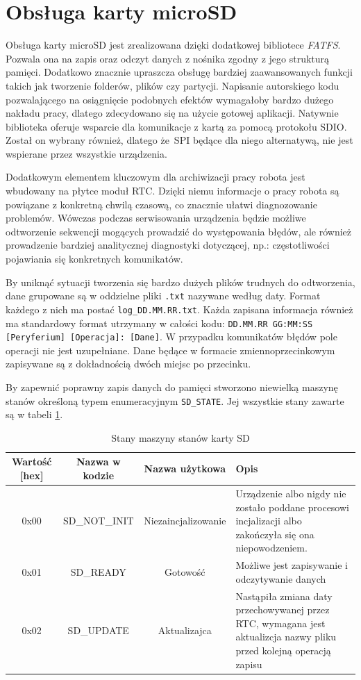 \section{Obsługa karty microSD}
Obsługa karty microSD jest zrealizowana dzięki dodatkowej bibliotece \textit{FATFS}. Pozwala ona na zapis oraz odczyt danych z nośnika zgodny z jego strukturą pamięci. Dodatkowo znacznie upraszcza obsługę bardziej zaawansowanych funkcji takich jak tworzenie folderów, plików czy partycji. Napisanie autorskiego kodu pozwalającego na osiągnięcie podobnych efektów wymagałoby bardzo dużego nakładu pracy, dlatego zdecydowano się na użycie gotowej aplikacji. Natywnie biblioteka oferuje wsparcie dla komunikacje z kartą za pomocą protokołu SDIO. Został on wybrany również, dlatego że~SPI będące dla niego alternatywą, nie jest wspierane przez wszystkie urządzenia. 

Dodatkowym elementem kluczowym dla archiwizacji pracy robota jest wbudowany na płytce moduł RTC. Dzięki niemu informacje o pracy robota są powiązane z konkretną chwilą czasową, co znacznie ułatwi diagnozowanie problemów. Wówczas podczas serwisowania urządzenia będzie możliwe odtworzenie sekwencji mogących prowadzić do występowania błędów, ale również prowadzenie bardziej analitycznej diagnostyki dotyczącej, np.: częstotliwości pojawiania się konkretnych komunikatów. 

By uniknąć sytuacji tworzenia się bardzo dużych plików trudnych do odtworzenia, dane grupowane są w oddzielne pliki \texttt{.txt} nazywane według daty. Format każdego z nich ma postać \texttt{log\_DD.MM.RR.txt}. Każda zapisana informacja również ma standardowy format utrzymany w całości kodu: \texttt{DD.MM.RR GG:MM:SS  [Peryferium] [Operacja]: [Dane]}. W przypadku komunikatów błędów pole operacji nie jest uzupełniane. Dane będące w formacie zmiennoprzecinkowym zapisywane są z dokładnością dwóch miejsc po przecinku. 

By zapewnić poprawny zapis danych do pamięci stworzono niewielką maszynę stanów określoną typem enumeracyjnym \texttt{SD\_STATE}. Jej wszystkie stany zawarte są w tabeli \ref{tab: sd_states}.

    \begin{table}[ht!]
        \centering
        \begin{tabular}{c | c | c | p{5.5cm}}
             Wartość [hex] & Nazwa w kodzie & Nazwa użytkowa & Opis  \\ \hline \hline
             0x00 & SD\_NOT\_INIT & Niezaincjalizowanie & Urządzenie albo nigdy nie zostało poddane procesowi incjalizacji albo zakończyła się ona niepowodzeniem. \\ \hline
             0x01 & SD\_READY & Gotowość & Możliwe jest zapisywanie i odczytywanie danych \\ \hline
             0x02 & SD\_UPDATE & Aktualizajca & Nastąpiła zmiana daty przechowywanej przez RTC, wymagana jest aktualizcja nazwy pliku przed kolejną operacją zapisu \\
        \end{tabular}
        \caption{\label{tab: sd_states} Stany maszyny stanów karty SD}
    \end{table}

